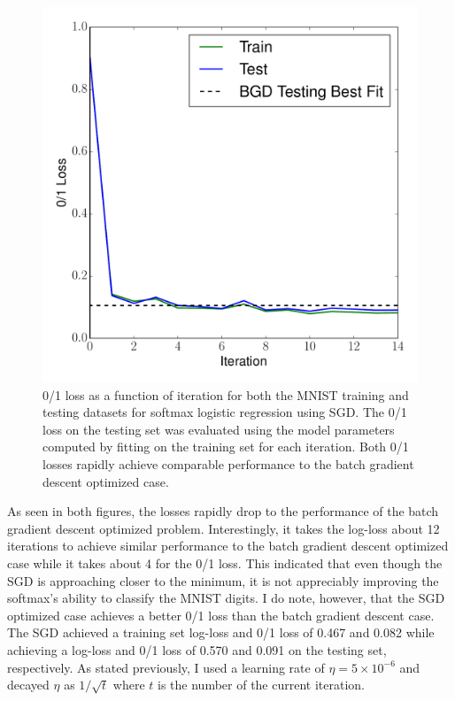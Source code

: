 \documentclass[12pt]{amsart}
\begin{document}
\begin{figure}[H]
	\includegraphics[width=\columnwidth]{sgd_mnist_multi_train_test_01.pdf}
    \caption{0/1 loss as a function of iteration for both the MNIST training and testing datasets for softmax logistic regression using SGD.  The 0/1 loss on the testing set was evaluated using the model parameters computed by fitting on the training set for each iteration.  Both 0/1 losses rapidly achieve comparable performance to the batch gradient descent optimized case.}
    \label{fig:sgd_mnist_01}
\end{figure}

As seen in both figures, the losses rapidly drop to the performance of the batch gradient descent optimized problem.  Interestingly, it takes the log-loss about 12 iterations to achieve similar performance to the batch gradient descent optimized case while it takes about 4 for the 0/1 loss.  This indicated that even though the SGD is approaching closer to the minimum, it is not appreciably improving the softmax's ability to classify the MNIST digits.  I do note, however, that the SGD optimized case achieves a better 0/1 loss than the batch gradient descent case.  The SGD achieved a training set log-loss and 0/1 loss of 0.467 and 0.082 while achieving a log-loss and 0/1 loss of 0.570 and 0.091 on the testing set, respectively.  As stated previously, I used a learning rate of $\eta = 5 \times 10^{-6}$ and decayed $\eta$ as $1/\sqrt{t}$ where $t$ is the number of the current iteration.
\end{document}
